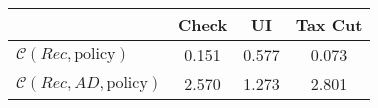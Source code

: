 \begin{tabular}{@{}lccc@{}}
\toprule
                          & Check      & UI    & Tax Cut    \\  \midrule
$\mathcal{C}(Rec,\text{policy})$ & 0.151  & 0.577  & 0.073     \\
$\mathcal{C}(Rec, AD,\text{policy})$ & 2.570  & 1.273  & 2.801     \\
\end{tabular}
